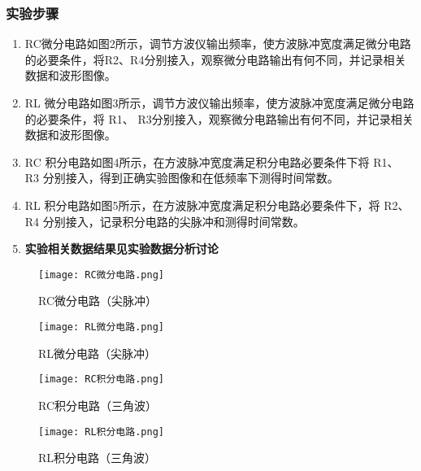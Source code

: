 \documentclass[dvipsnames, svgnames,a4paper,11pt]{article}
\begin{document}
	\subsubsection{实验步骤}
\begin{enumerate}
	 \item  RC微分电路如图2所示，调节方波仪输出频率，使方波脉冲宽度满足微分电路的必要条件，将R2、R4分别接入，观察微分电路输出有何不同，并记录相关数据和波形图像。
	 \item RL 微分电路如图3所示，调节方波仪输出频率，使方波脉冲宽度满足微分电路的必要条件，将 R1、 R3分别接入，观察微分电路输出有何不同，并记录相关数据和波形图像。
	 \item RC 积分电路如图4所示，在方波脉冲宽度满足积分电路必要条件下将 R1、 R3 分别接入，得到正确实验图像和在低频率下测得时间常数。
	 \item RL 积分电路如图5所示，在方波脉冲宽度满足积分电路必要条件下，将 R2、 R4 分别接入，记录积分电路的尖脉冲和测得时间常数。
	 \item \textbf{实验相关数据结果见实验数据分析讨论}
	\end{enumerate}
	 \begin{figure}[H]
		\begin{minipage}[b]{0.5\linewidth}
		  \centering
		  \texttt{[image: RC微分电路.png]}
		  \caption{RC微分电路（尖脉冲）}
		\end{minipage}
		\hfill
		\begin{minipage}[b]{0.5\linewidth}
		  \centering
		  \texttt{[image: RL微分电路.png]}
		  \caption{RL微分电路（尖脉冲）}
		\end{minipage}
	 \end{figure}
	 \begin{figure}[H]
		\begin{minipage}[b]{0.5\linewidth}
		  \centering
		  \texttt{[image: RC积分电路.png]}
		  \caption{RC积分电路（三角波）}
		\end{minipage}
		\hfill
		\begin{minipage}[b]{0.5\linewidth}
		  \centering
		  \texttt{[image: RL积分电路.png]}
		  \caption{RL积分电路（三角波）}
		\end{minipage}
	 \end{figure}
	 

\end{document}
